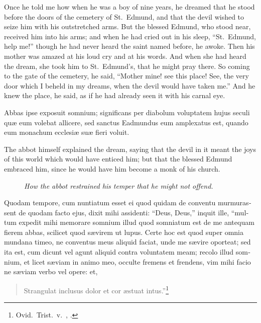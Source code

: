 \documentclass[10pt]{book}
\newcommand{\blockhead}[4][]{
\begin{figure}
\centering
\vspace{#4}
\parbox{2.75cm}{\begin{center}\footnotesize \color{BrickRed} \emph{#2}\\ #1 \end{center}}
\end{figure}
}
\begin{document}
\begin{paracol}{2}
\begin{otherlanguage}{latin}
\end{otherlanguage}

\switchcolumn

Once he told me how when he was a boy of nine years, he dreamed that he stood before the doors of the cemetery of St.\ Edmund, and that the devil wished to seize him with his outstretched arms. But the blessed Edmund, who stood near, received him into his arms; and when he had cried out in his sleep, ``St.\ Edmund, help me!'' though he had never heard the saint named before, he awoke. Then his mother was amazed at his loud cry and at his words. And when she had heard the dream, she took him to St.\ Edmund's, that he might pray there. So coming to the gate of the cemetery, he said, ``Mother mine! see this place! See, the very door which I beheld in my dreams, when the devil would have taken me.'' And he knew the place, he said, as if he had already seen it with his carnal eye.

\switchcolumn*

\begin{otherlanguage}{latin}
Abbas ipse exposuit somnium; significans per diabolum voluptatem hujus seculi qu\ae{} eum volebat allicere, sed sanctus Eadmundus eum amplexatus est, quando eum monachum ecclesi\ae{} su\ae{} fieri voluit.
\end{otherlanguage}

\switchcolumn

The abbot himself explained the dream, saying that the devil in it meant the joys of this world which would have enticed him; but that the blessed Edmund embraced him, since he would have him become a monk of his church.

\switchcolumn*

\begin{otherlanguage}{latin}
\blockhead{How the abbot restrained his temper that he might not offend.}{4}{-0.45cm}
Quodam tempore, cum nuntiatum esset ei quod quidam de conventu murmurassent de quodam facto ejus, dixit mihi assidenti: ``Deus, Deus,'' inquit ille, ``multum expedit mihi memorare somnium illud quod somniatum est de me antequam fierem abbas, scilicet quod s\ae{}virem ut lupus. Certe hoc est quod super omnia mundana timeo, ne conventus meus aliquid faciat, unde me s\ae{}vire oporteat; sed ita est, cum dicunt vel agunt aliquid contra voluntatem meam; recolo illud somnium, et licet s\ae{}viam in animo meo, occulte fremens et frendens, vim mihi facio ne s\ae{}viam verbo vel opere: et,
\vspace{-0.5cm}
\begin{verse}
\footnotesize
Strangulat inclusus dolor et cor \ae{}stuat intus.''\footnote[\textdagger]{Ovid.\ Trist.\ v.\ , .}
\end{verse}


\end{otherlanguage}
\end{paracol}
\end{document}
